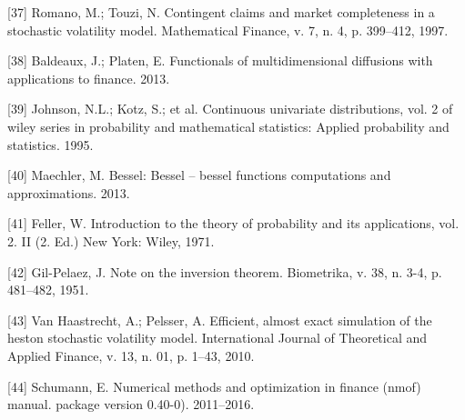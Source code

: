 \documentclass[12pt,oneside]{reedthesis}
\theoremstyle{definition}
\theoremstyle{definition}
\theoremstyle{remark}
\begin{document}
  \hypertarget{ref-romano1997}{}
  {[}37{]} Romano, M.; Touzi, N. Contingent claims and market completeness
  in a stochastic volatility model. Mathematical Finance, v. 7, n. 4, p.
  399--412, 1997.
  
  \hypertarget{ref-baldeaux}{}
  {[}38{]} Baldeaux, J.; Platen, E. Functionals of multidimensional
  diffusions with applications to finance. 2013.
  
  \hypertarget{ref-johnson1995}{}
  {[}39{]} Johnson, N.L.; Kotz, S.; et al. Continuous univariate
  distributions, vol. 2 of wiley series in probability and mathematical
  statistics: Applied probability and statistics. 1995.
  
  \hypertarget{ref-besselpkg}{}
  {[}40{]} Maechler, M. Bessel: Bessel -- bessel functions computations
  and approximations. 2013.
  
  \hypertarget{ref-feller1971introduction}{}
  {[}41{]} Feller, W. Introduction to the theory of probability and its
  applications, vol. 2. II (2. Ed.) New York: Wiley, 1971.
  
  \hypertarget{ref-gil1951note}{}
  {[}42{]} Gil-Pelaez, J. Note on the inversion theorem. Biometrika, v.
  38, n. 3-4, p. 481--482, 1951.
  
  \hypertarget{ref-van2010efficient}{}
  {[}43{]} Van Haastrecht, A.; Pelsser, A. Efficient, almost exact
  simulation of the heston stochastic volatility model. International
  Journal of Theoretical and Applied Finance, v. 13, n. 01, p. 1--43,
  2010.
  
  \hypertarget{ref-nmofpack}{}
  {[}44{]} Schumann, E. Numerical methods and optimization in finance
  (nmof) manual. package version 0.40-0). 2011--2016.


\end{document}
